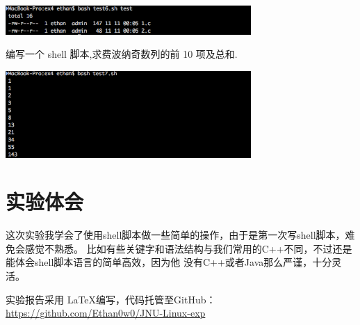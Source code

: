 \documentclass{JNUexp}
\begin{document}
\begin{image}
    \begin{center}
        \includegraphics[width=0.7\textwidth]{5}
    \end{center}
\end{image}
\begin{problem}
    编写一个 shell 脚本,求费波纳奇数列的前 10 项及总和.
\end{problem}

\begin{answer}
    
\end{answer}

\begin{image}
    \begin{center}
        \includegraphics[width=0.7\textwidth]{6}
    \end{center}
\end{image}


\section{实验体会}

这次实验我学会了使用shell脚本做一些简单的操作，由于是第一次写shell脚本，难免会感觉不熟悉。
比如有些关键字和语法结构与我们常用的C++不同，不过还是能体会shell脚本语言的简单高效，因为他
没有C++或者Java那么严谨，十分灵活。\\
\vfill

实验报告采用 \LaTeX 编写，代码托管至GitHub：\\
\url{https://github.com/Ethan0w0/JNU-Linux-exp}
\end{document}

